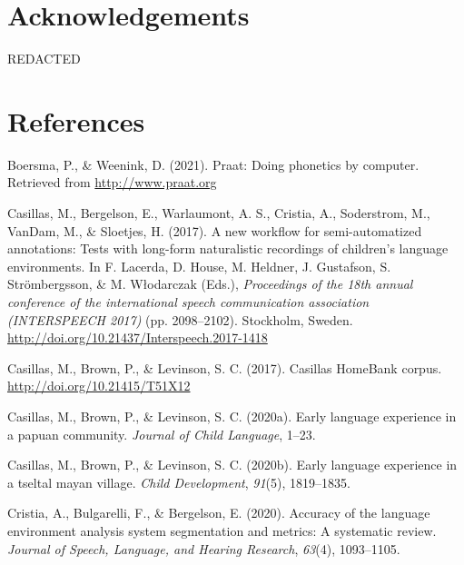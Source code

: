 \documentclass[10pt, letterpaper]{article}
\begin{document}
\hypertarget{acknowledgements}{%
\section{Acknowledgements}\label{acknowledgements}}

REDACTED

\hypertarget{references}{%
\section{References}\label{references}}

\setlength{\parindent}{-0.1in} 
\setlength{\leftskip}{0.125in}

\noindent

\hypertarget{refs}{}
\leavevmode\hypertarget{ref-PRAAT}{}%
Boersma, P., \& Weenink, D. (2021). Praat: Doing phonetics by computer.
Retrieved from \url{http://www.praat.org}

\leavevmode\hypertarget{ref-casillas2017workflow}{}%
Casillas, M., Bergelson, E., Warlaumont, A. S., Cristia, A., Soderstrom,
M., VanDam, M., \& Sloetjes, H. (2017). A new workflow for
semi-automatized annotations: Tests with long-form naturalistic
recordings of children's language environments. In F. Lacerda, D. House,
M. Heldner, J. Gustafson, S. Strömbergsson, \& M. Włodarczak (Eds.),
\emph{Proceedings of the 18th annual conference of the international
speech communication association (INTERSPEECH 2017)} (pp. 2098--2102).
Stockholm, Sweden. \url{http://doi.org/10.21437/Interspeech.2017-1418}

\leavevmode\hypertarget{ref-Casillas-HB}{}%
Casillas, M., Brown, P., \& Levinson, S. C. (2017). Casillas HomeBank
corpus. \url{http://doi.org/10.21415/T51X12}

\leavevmode\hypertarget{ref-casillas2020rossel}{}%
Casillas, M., Brown, P., \& Levinson, S. C. (2020a). Early language
experience in a papuan community. \emph{Journal of Child Language},
1--23.

\leavevmode\hypertarget{ref-casillas2020tseltal}{}%
Casillas, M., Brown, P., \& Levinson, S. C. (2020b). Early language
experience in a tseltal mayan village. \emph{Child Development},
\emph{91}(5), 1819--1835.

\leavevmode\hypertarget{ref-cristia2020accuracy}{}%
Cristia, A., Bulgarelli, F., \& Bergelson, E. (2020). Accuracy of the
language environment analysis system segmentation and metrics: A
systematic review. \emph{Journal of Speech, Language, and Hearing
Research}, \emph{63}(4), 1093--1105.
\end{document}
